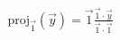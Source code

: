 \documentclass[preview]{standalone}
\begin{document}
\begin{align*}
\mathrm{proj}_{\overrightarrow{1}}(\overrightarrow{y}) = \overrightarrow{1} \frac{\overrightarrow{1} \cdot \overrightarrow{y}}{\overrightarrow{1} \cdot \overrightarrow{1}}
\end{align*}
\end{document}
